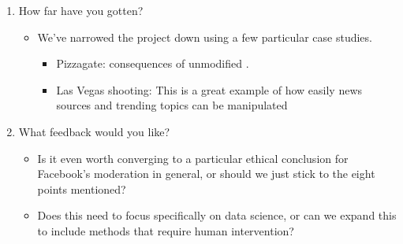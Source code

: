 \documentclass[11pt]{article}
\begin{document}
\begin{enumerate}
  \item How far have you gotten? 
    \begin{itemize}
      \item We've narrowed the project down using a few particular case studies.
        \begin{itemize}
          \item Pizzagate: consequences of unmodified .
          \item Las Vegas shooting: This is a great example of how easily news sources and trending topics can be manipulated
        \end{itemize}
    \end{itemize}

  \item What feedback would you like?
    \begin{itemize}
      \item Is it even worth converging to a particular ethical conclusion for Facebook's moderation in general, or should we just stick to the eight points mentioned?
      \item Does this need to focus specifically on data science, or can we expand this to include methods that require human intervention?
    \end{itemize}

\end{enumerate}
\end{document}
